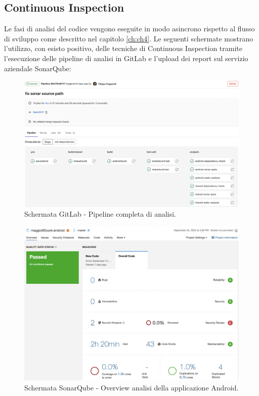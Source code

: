 \subsection{Continuous Inspection}
Le fasi di analisi del codice vengono eseguite in modo asincrono rispetto al flusso di sviluppo come descritto nel capitolo \ref{ch:ch4}. Le seguenti schermate mostrano l'utilizzo, con esisto positivo, delle tecniche di Continuous Inspection tramite l'esecuzione delle pipeline di analisi in GitLab e l'upload dei report sul servizio aziendale SonarQube:
\begin{figure}[H]
\centering
    \includegraphics[width=1\textwidth]{img/Screenshot 2022-09-28 at 16.15.34.png}
    \caption{Schermata GitLab - Pipeline completa di analisi.}
    \label{fullpipeline}
\end{figure}

\begin{figure}[H]
\centering
    \includegraphics[width=1\textwidth]{img/Screenshot 2022-09-28 at 16.22.16.png}
    \caption{Schermata SonarQube - Overview analisi della applicazione Android.}
    \label{analisipipeline}
\end{figure}